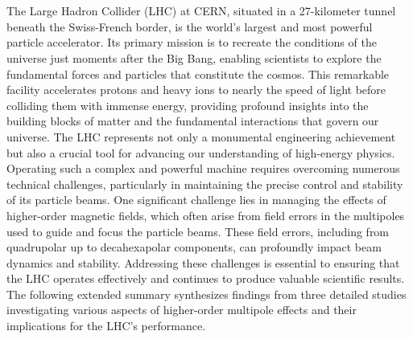 \chapter{}

\newcommand{\fontsizesummary}{12pt}
\newcommand{\fontskipsummary}{15pt}

{
\fontsize{\fontsizesummary}{\fontskipsummary}\selectfont

The Large Hadron Collider (LHC) at CERN, situated in a 27-kilometer tunnel beneath the Swiss-French
border, is the world's largest and most powerful particle accelerator. Its primary mission is to
recreate the conditions of the universe just moments after the Big Bang, enabling scientists to
explore the fundamental forces and particles that constitute the cosmos. This remarkable facility
accelerates protons and heavy ions to nearly the speed of light before colliding them with immense
energy, providing profound insights into the building blocks of matter and the fundamental
interactions that govern our universe. The LHC represents not only a monumental engineering
achievement but also a crucial tool for advancing our understanding of high-energy physics. \\
\indent
Operating such a complex and powerful machine requires overcoming numerous technical challenges,
particularly in maintaining the precise control and stability of its particle beams. One significant
challenge lies in managing the effects of higher-order magnetic fields, which often arise from field
errors in the multipoles used to guide and focus the particle beams. These field errors,
including from quadrupolar up to decahexapolar components, can profoundly impact beam dynamics and
stability. Addressing these challenges is essential to ensuring that the LHC operates effectively
and continues to produce valuable scientific results. The following extended summary synthesizes
findings from three detailed studies investigating various aspects of higher-order multipole effects
and their implications for the LHC's performance.

}
